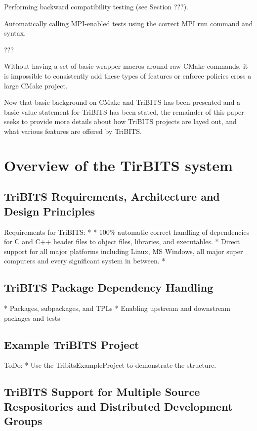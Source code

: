 \documentclass[10pt]{article}
\begin{document}
\begin{compactitem}
\item Performing backward compatibility testing (see Section ???).
\item Automatically calling MPI-enabled tests using the correct MPI run command and syntax.
\item ???
\end{compactitem}

Without having a set of basic wrapper macros around raw CMake commands, it is impossible to consistently add these types of features or enforce policies cross a large CMake project.

Now that basic background on CMake and TriBITS has been presented and a basic value statement for TriBITS has been stated, the remainder of this paper seeks to provide more details about how TriBITS projects are layed out, and what various features are offered by TriBITS.

%
\section{Overview of the TirBITS system}
%

%
\subsection{TriBITS Requirements, Architecture and Design Principles}
%

Requirements for TriBITS:
* 
* 100\% automatic correct handling of dependencies for C and C++ header files to object files, libraries, and executables.
* Direct support for all major platforms including Linux, MS Windows,  all major super computers and every significant system in between.
* 

%
\subsection{TriBITS Package Dependency Handling}
%

* Packages, subpackages, and TPLs
* Enabling upstream and downstream packages and tests

%
\subsection{Example TriBITS Project}
%

ToDo:
* Use the TribitsExampleProject to demonstrate the structure.


%
\subsection{TriBITS Support for Multiple Source Respositories and Distributed Development Groups}
%
\end{document}
